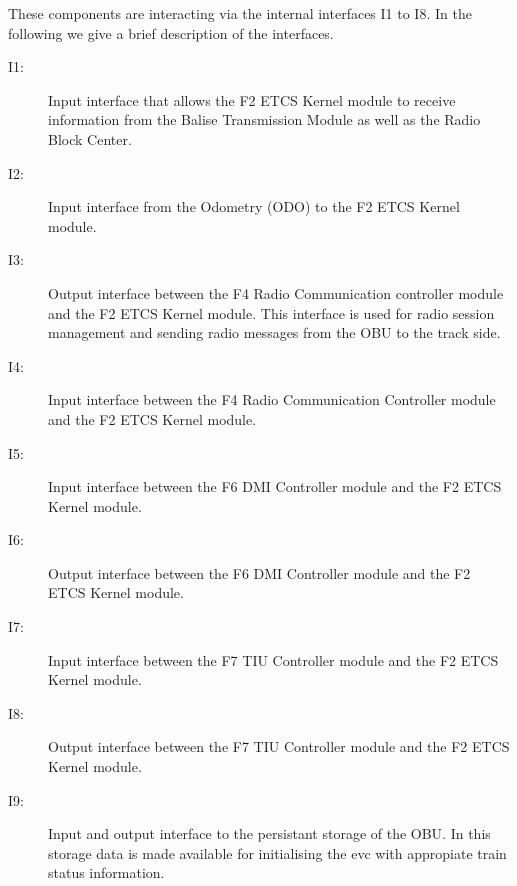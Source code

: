 These components are interacting via the internal interfaces I1 to I8. In the following we give a brief description of the interfaces.
\begin{description}
\item[I1:] Input interface that allows the F2 ETCS Kernel module to receive information from the Balise Transmission Module as well as the Radio Block Center.

\item[I2:] Input interface from the Odometry (ODO) to the F2 ETCS Kernel module.

\item[I3:] Output interface between the F4 Radio Communication controller module and the F2 ETCS Kernel module. This interface is used for radio session management and sending radio messages from the OBU to the track side.

\item[I4:] Input interface between the F4 Radio Communication Controller module and the F2 ETCS Kernel module.

\item[I5:] Input interface between the F6 DMI Controller module and the F2 ETCS Kernel module.

\item[I6:] Output interface between the F6 DMI Controller module and the F2 ETCS Kernel module.

\item[I7:] Input interface between the F7 TIU Controller module and the F2 ETCS Kernel module.

\item[I8:] Output interface between the F7 TIU Controller module and the F2 ETCS Kernel module.
\item[I9:] Input and output interface to the persistant storage of the OBU. In this storage data is made available for initialising the evc with appropiate train status information.

\end{description}






